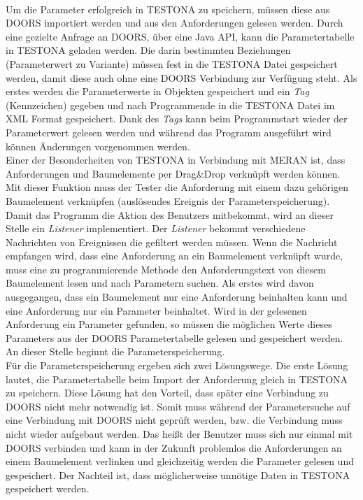 \paragraph{}
 
Um die Parameter erfolgreich in TESTONA zu speichern, müssen diese aus DOORS importiert werden und aus den Anforderungen gelesen werden. Durch eine gezielte Anfrage an DOORS, über eine Java API, kann die Parametertabelle in TESTONA geladen werden. Die darin bestimmten Beziehungen (Parameterwert zu Variante) müssen fest in die TESTONA Datei gespeichert werden, damit diese auch ohne eine DOORS Verbindung zur Verfügung steht. Als erstes werden die Parameterwerte in Objekten gespeichert und ein \textit{Tag} (Kennzeichen) gegeben und nach Programmende in die TESTONA Datei im XML Format gespeichert. Dank des \textit{Tags} kann beim Programmstart wieder der Parameterwert gelesen werden und während das Programm ausgeführt wird können Änderungen vorgenommen werden.\\

Einer der Besonderheiten von TESTONA in Verbindung mit MERAN ist, dass Anforderungen und Baumelemente per Drag\&Drop verknüpft werden können. Mit dieser Funktion muss der Tester die Anforderung mit einem dazu gehörigen Baumelement verknüpfen (auslösendes Ereignis der Parameterspeicherung). Damit das Programm die Aktion des Benutzers mitbekommt, wird an dieser Stelle ein \textit{Listener} implementiert. Der \textit{Listener} bekommt verschiedene Nachrichten von Ereignissen die gefiltert werden müssen. Wenn die Nachricht empfangen wird, dass eine Anforderung an ein Baumelement verknüpft wurde, muss eine zu programmierende Methode den Anforderungstext von diesem Baumelement lesen und nach Parametern suchen. Als erstes wird davon ausgegangen, dass ein Baumelement nur eine Anforderung beinhalten kann und eine Anforderung nur ein Parameter beinhaltet. Wird in der gelesenen Anforderung ein Parameter gefunden, so müssen die möglichen Werte dieses Parameters aus der DOORS Parametertabelle gelesen und gespeichert werden. An dieser Stelle beginnt die Parameterspeicherung.\\

Für die Parameterspeicherung ergeben sich zwei Lösungswege. Die erste Lösung lautet, die Parametertabelle beim Import der Anforderung gleich in TESTONA zu speichern. Diese Lösung hat den Vorteil, dass später eine Verbindung zu DOORS nicht mehr notwendig ist. Somit muss während der Parametersuche auf eine Verbindung mit DOORS nicht geprüft werden, bzw. die Verbindung muss nicht wieder aufgebaut werden. Das heißt der Benutzer muss sich nur einmal mit DOORS verbinden und kann in der Zukunft problemlos die Anforderungen an einem Baumelement verlinken und gleichzeitig werden die Parameter gelesen und gespeichert. Der Nachteil ist, dass möglicherweise unnötige Daten in TESTONA gespeichert werden.\\

